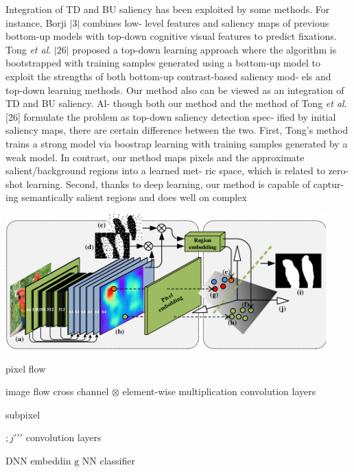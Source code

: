 \documentclass[a4paper,10pt]{article}
\begin{document}
Integration of TD and BU saliency has been exploited by some methods. For instance, Borji $|3|$ combines low- level features and saliency maps of previous bottom-up models with top-down cognitive visual features to predict fixations. Tong {\it et al}. $|26|$ proposed a top-down learning approach where the algorithm is bootstrapped with training samples generated using a bottom-up model to exploit the strengths of both bottom-up contrast-based saliency mod- els and top-down learning methods. Our method also can be viewed as an integration of TD and BU saliency. Al- though both our method and the method of Tong {\it et al}. [26] formulate the problem as top-down saliency detection spec- ified by initial saliency maps, there are certain difference between the two. First, Tong's method trains a strong model via boostrap learning with training samples generated by a weak model. In contrast, our method maps pixels and the approximate salient/background regions into a learned met- ric space, which is related to zero-shot learning. Second, thanks to deep learning, our method is capable of captur- ing semantically salient regions and does well on complex
\begin{center}
\includegraphics[width=123.61mm,height=52.15mm]{./zengyu_images/image003.eps}
\end{center}
pixel flow

image flow cross channel $\otimes$ element-wise multiplication   convolution layers

subpixel

$;j\prime\prime\prime$  convolution layers

DNN embeddin $\mathrm{g}$ NN classifier
\end{document}
